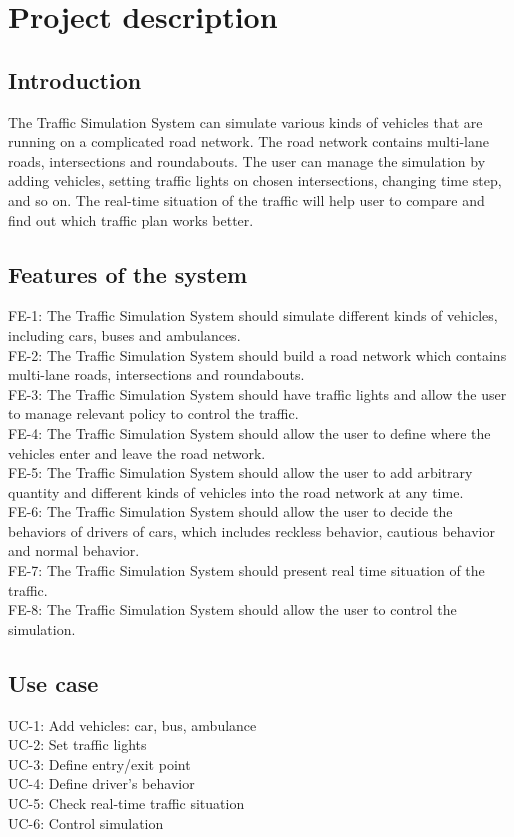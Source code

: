 \documentclass[a4paper,12pt]{article}
\begin{document}
\section{Project description}

\subsection{Introduction}
The Traffic Simulation System can simulate various kinds of vehicles that are running on a complicated road network. The road network contains multi-lane roads, intersections and roundabouts. The user can manage the simulation by adding vehicles, setting traffic lights on chosen intersections, changing time step, and so on. The real-time situation of the traffic will help user to compare and find out which traffic plan works better.

\subsection{Features of the system}
FE-1: The Traffic Simulation System should simulate different kinds of vehicles, including cars, buses and ambulances.\\
FE-2: The Traffic Simulation System should build a road network which contains multi-lane roads, intersections and roundabouts.\\
FE-3: The Traffic Simulation System should have traffic lights and allow the user to manage relevant policy to control the traffic.\\
FE-4: The Traffic Simulation System should allow the user to define where the vehicles enter and leave the road network.\\
FE-5: The Traffic Simulation System should allow the user to add arbitrary quantity and different kinds of vehicles into the road network at any time.\\
FE-6: The Traffic Simulation System should allow the user to decide the behaviors of drivers of cars, which includes reckless behavior, cautious behavior and normal behavior.\\
FE-7: The Traffic Simulation System should present real time situation of the traffic.\\
FE-8: The Traffic Simulation System should allow the user to control the simulation.


\subsection{Use case}
UC-1: Add vehicles: car, bus, ambulance\\
UC-2: Set traffic lights\\
UC-3: Define entry/exit point\\
UC-4: Define driver's behavior\\
UC-5: Check real-time traffic situation\\
UC-6: Control simulation
\end{document}
